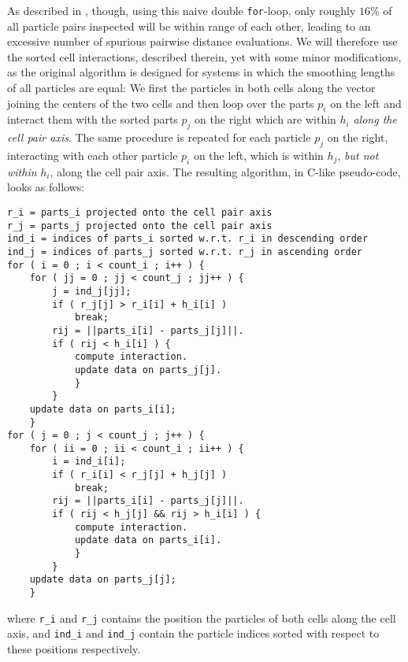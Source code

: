 \documentclass[final]{siamltex}
\begin{document}
As described in \cite{ref:Gonnet2007}, though, using this
naive double {\tt for}-loop, only roughly $16\%$ of all particle
pairs inspected will be within range of each other, leading
to an excessive number of spurious pairwise distance evaluations.
We will therefore use the sorted cell
interactions, described therein, yet with some minor modifications, as
the original algorithm is designed for systems in which the
smoothing lengths of all particles are equal:
We first the particles in both cells along the vector joining
the centers of the two cells and then loop over the
parts $p_i$ on the left and interact them with the sorted parts $p_j$
on the right which are within $h_i$ {\em along the cell pair axis}.
The same procedure is repeated for each particle $p_j$ on the
right, interacting with each other particle $p_i$ on the
left, which is within $h_j$, {\em but not within} $h_i$, along
the cell pair axis.
The resulting algorithm, in C-like pseudo-code, looks as follows:
        
\begin{center}\begin{minipage}{0.8\textwidth}
    \begin{lstlisting}
r_i = parts_i projected onto the cell pair axis
r_j = parts_j projected onto the cell pair axis
ind_i = indices of parts_i sorted w.r.t. r_i in descending order
ind_j = indices of parts_j sorted w.r.t. r_j in ascending order
for ( i = 0 ; i < count_i ; i++ ) {
    for ( jj = 0 ; jj < count_j ; jj++ ) {
        j = ind_j[jj];
        if ( r_j[j] > r_i[i] + h_i[i] )
            break;
        rij = ||parts_i[i] - parts_j[j]||.
        if ( rij < h_i[i] ) {
            compute interaction.
            update data on parts_j[j].
            }
        }
    update data on parts_i[i];
    }
for ( j = 0 ; j < count_j ; j++ ) {
    for ( ii = 0 ; ii < count_i ; ii++ ) {
        i = ind_i[i];
        if ( r_i[i] < r_j[j] + h_j[j] )
            break;
        rij = ||parts_i[i] - parts_j[j]||.
        if ( rij < h_j[j] && rij > h_i[i] ) {
            compute interaction.
            update data on parts_i[i].
            }
        }
    update data on parts_j[j];
    }
    \end{lstlisting}
\end{minipage}\end{center}
        
\noindent where {\tt r\_i} and {\tt r\_j} contains the position
the particles of both cells along the cell axis, and
{\tt ind\_i} and {\tt ind\_j} contain the particle indices
sorted with respect to these positions respectively.
\end{document}
